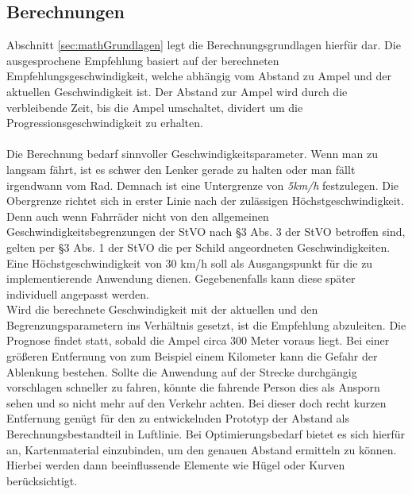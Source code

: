 \subsection{Berechnungen}
Abschnitt \ref{sec:mathGrundlagen} legt die Berechnungsgrundlagen hierfür dar. Die ausgesprochene Empfehlung basiert auf der berechneten Empfehlungsgeschwindigkeit, welche abhängig vom Abstand zu Ampel und der aktuellen Geschwindigkeit ist. Der Abstand zur Ampel wird durch die verbleibende Zeit, bis die Ampel umschaltet, dividert um die Progressionsgeschwindigkeit zu erhalten.\\\\
Die Berechnung bedarf sinnvoller Geschwindigkeitsparameter. Wenn man zu langsam fährt, ist es schwer den Lenker gerade zu halten oder man fällt irgendwann vom Rad. Demnach ist eine Untergrenze von \textit{5km/h} festzulegen. Die Obergrenze richtet sich in erster Linie nach der zulässigen Höchstgeschwindigkeit. Denn auch wenn Fahrräder nicht von den allgemeinen Geschwindigkeitsbegrenzungen der StVO nach \S 3 Abs. 3 der StVO betroffen sind, gelten per \S 3 Abs. 1 der StVO die per Schild angeordneten Geschwindigkeiten. Eine Höchstgeschwindigkeit von 30 km/h soll als Ausgangspunkt für die zu implementierende Anwendung dienen. Gegebenenfalls kann diese später individuell angepasst werden. \\
Wird die berechnete Geschwindigkeit mit der aktuellen und den Begrenzungsparametern ins Verhältnis gesetzt, ist die Empfehlung abzuleiten. Die Prognose findet statt, sobald die Ampel circa 300 Meter voraus liegt. Bei einer größeren Entfernung von zum Beispiel einem Kilometer kann die Gefahr der Ablenkung bestehen. Sollte die Anwendung auf der Strecke durchgängig vorschlagen schneller zu fahren, könnte die fahrende Person dies als Ansporn sehen und so nicht mehr auf den Verkehr achten. Bei dieser doch recht kurzen Entfernung genügt für den zu entwickelnden Prototyp der Abstand als Berechnungsbestandteil in Luftlinie. Bei Optimierungsbedarf bietet es sich hierfür an, Kartenmaterial einzubinden, um den genauen Abstand ermitteln zu können. Hierbei werden dann beeinflussende Elemente wie Hügel oder Kurven berücksichtigt.
